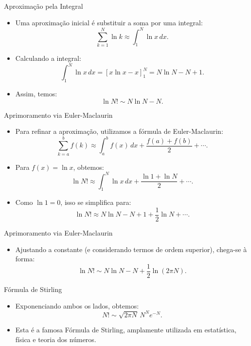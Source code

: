 \documentclass[11pt]{beamer}
\begin{document}
\begin{frame}{Aproximação pela Integral}
  \begin{itemize}
    \item Uma aproximação inicial é substituir a soma por uma integral:
      \[
      \sum_{k=1}^{N} \ln k \approx \int_{1}^{N} \ln x\,dx.
      \]
    \item Calculando a integral:
      \[
      \int_{1}^{N} \ln x\,dx = \left[ x\ln x - x \right]_1^N = N\ln N - N + 1.
      \]
    \item Assim, temos:
      \[
      \ln N! \sim N\ln N - N.
      \]
  \end{itemize}
\end{frame}

\begin{frame}{Aprimoramento via Euler-Maclaurin}
  \begin{itemize}
    \item Para refinar a aproximação, utilizamos a fórmula de Euler-Maclaurin:
      \[
      \sum_{k=a}^{b} f(k) \approx \int_{a}^{b} f(x)\,dx + \frac{f(a)+f(b)}{2} + \cdots.
      \]
    \item Para $f(x)=\ln x$, obtemos:
      \[
      \ln N! \approx \int_{1}^{N} \ln x\,dx + \frac{\ln 1 + \ln N}{2} + \cdots.
      \]
    \item Como $\ln 1=0$, isso se simplifica para:
      \[
      \ln N! \approx N\ln N - N + 1 + \frac{1}{2}\ln N + \cdots.
      \]

  \end{itemize}
\end{frame}
      
\begin{frame}{Aprimoramento via Euler-Maclaurin}
  \begin{itemize}
    \item Ajustando a constante (e considerando termos de ordem superior), chega-se à forma:
      \[
      \ln N! \sim N\ln N - N + \frac{1}{2}\ln(2\pi N).
      \]
  \end{itemize}
\end{frame}

\begin{frame}{Fórmula de Stirling}
  \begin{itemize}
    \item Exponenciando ambos os lados, obtemos:
      \[
      N! \sim \sqrt{2\pi N}\, N^N e^{-N}.
      \]
    \item Esta é a famosa Fórmula de Stirling, amplamente utilizada em estatística, física e teoria dos números.
  \end{itemize}
\end{frame}
\end{document}
